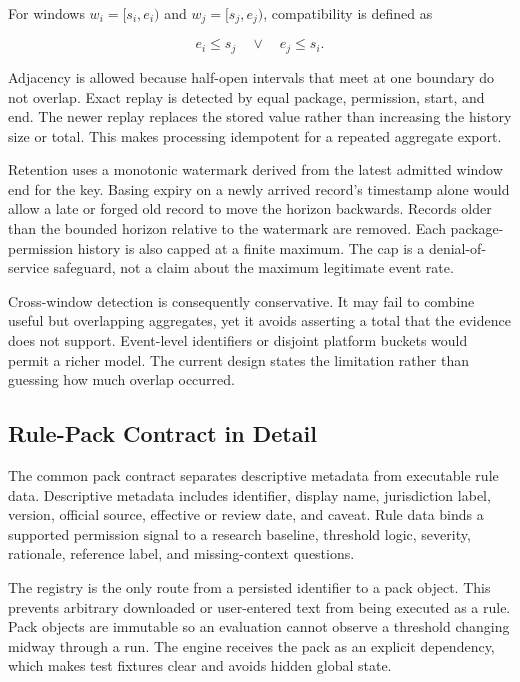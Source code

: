 For windows \(w_i=[s_i,e_i)\) and \(w_j=[s_j,e_j)\), compatibility is defined as

\begin{equation}
e_i \leq s_j \quad \lor \quad e_j \leq s_i.
\end{equation}

Adjacency is allowed because half-open intervals that meet at one boundary do not overlap. Exact replay is detected by equal package, permission, start, and end. The newer replay replaces the stored value rather than increasing the history size or total. This makes processing idempotent for a repeated aggregate export.

Retention uses a monotonic watermark derived from the latest admitted window end for the key. Basing expiry on a newly arrived record's timestamp alone would allow a late or forged old record to move the horizon backwards. Records older than the bounded horizon relative to the watermark are removed. Each package-permission history is also capped at a finite maximum. The cap is a denial-of-service safeguard, not a claim about the maximum legitimate event rate.

Cross-window detection is consequently conservative. It may fail to combine useful but overlapping aggregates, yet it avoids asserting a total that the evidence does not support. Event-level identifiers or disjoint platform buckets would permit a richer model. The current design states the limitation rather than guessing how much overlap occurred.

\subsection{Rule-Pack Contract in Detail}

The common pack contract separates descriptive metadata from executable rule data. Descriptive metadata includes identifier, display name, jurisdiction label, version, official source, effective or review date, and caveat. Rule data binds a supported permission signal to a research baseline, threshold logic, severity, rationale, reference label, and missing-context questions.

The registry is the only route from a persisted identifier to a pack object. This prevents arbitrary downloaded or user-entered text from being executed as a rule. Pack objects are immutable so an evaluation cannot observe a threshold changing midway through a run. The engine receives the pack as an explicit dependency, which makes test fixtures clear and avoids hidden global state.

